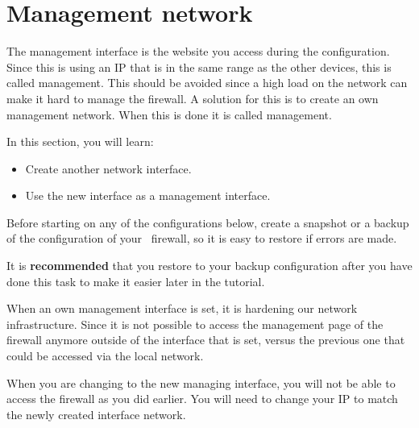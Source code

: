 \newpage

\section{Management network}
The management interface is the website you access during the configuration. Since this is using an IP that is in the same range as the other devices, this is called  management. This should be avoided since a high load on the network can make it hard to manage the firewall. A solution for this is to create an own management network. When this is done it is called  management.

In this section, you will learn:
\begin{itemize}
    \item Create another network interface.
    \item Use the new interface as a management interface.
\end{itemize}

\begin{importantblock}
    Before starting on any of the configurations below, create a snapshot or a backup of the configuration of your \opnsense\ firewall, so it is easy to restore if errors are made. 
    
    It is \textbf{recommended} that you restore to your backup configuration after you have done this task to make it easier later in the tutorial.
\end{importantblock}

When an own management interface is set, it is hardening our network infrastructure. Since it is not possible to access the management page of the firewall anymore outside of the interface that is set, versus the previous one that could be accessed via the local network.


\begin{importantblock}
    When you are changing to the new managing interface, you will not be able to access the firewall as you did earlier. You will need to change your IP to match the newly created interface network.
\end{importantblock}

